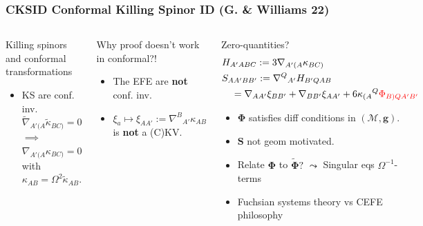 \documentclass[10pt]{beamer}
\theoremstyle{plain}
\def\bmg{{\bm g}}
\def\bmS{{\bm S}}
\begin{document}
\begin{frame}
\frametitle{ CKSID Conformal Killing Spinor ID (G. \& Williams 22)}
\begin{columns}
\column{7.5cm}
\vspace{-7mm}
\begin{block}{ Killing spinors and conformal transformations}
  \begin{itemize}
  \item KS are
    conf. inv.
     $\tilde{\nabla}_{A'(A}\tilde{\kappa}_{BC)}=0$
    $\implies$ $\nabla_{A'(A}\kappa_{BC)}=0$
    with
    $\kappa_{AB}=\Omega^2\tilde{\kappa}_{AB}$.
  \end{itemize}
\end{block}
\pause
\vspace{-3mm}
\begin{alertblock}{Why proof doesn't work in conformal?!}
  \begin{itemize}
   \item The EFE are \textbf{not} conf. inv.
   \item $\xi_{a} \mapsto \xi_{AA'}:= \nabla^{B}{}_{A'}\kappa_{AB}$ is
     \textbf{not} a (C)KV.
  \end{itemize}
  \end{alertblock}
\vspace{-4mm}
\pause
\begin{exampleblock}{Zero-quantities?}
   \vspace{-2mm}
  \begin{align*}
  &H_{A'ABC}  := 3\nabla_{A'(A}\kappa_{BC)}\\
  & S_{AA'BB'}  :=\nabla^{Q}{}_{A'}H_{B'Q AB} \\ & \quad = \nabla_{AA'} \xi_{BB'} +
       \nabla_{BB'}\xi_{AA'} + 6\kappa_{(A}{}^{Q}\color{red}{{\Phi}}_{B)QA'B'}
  \end{align*}
  \vspace{-5mm}
     \begin{itemize}
   \item   $\bm\Phi$ satisfies diff conditions in $(\mathcal{M},\bmg)$.
   \item $\bmS$ not geom motivated.
   \item Relate $\bm\Phi$ to $\tilde{\bm\Phi}?$ $\leadsto$ Singular eqs $\Omega^{-1}$-terms
   \item Fuchsian systems theory vs CEFE philosophy

\end{itemize}
\end{exampleblock}
\end{columns}
\end{frame}
\end{document}
